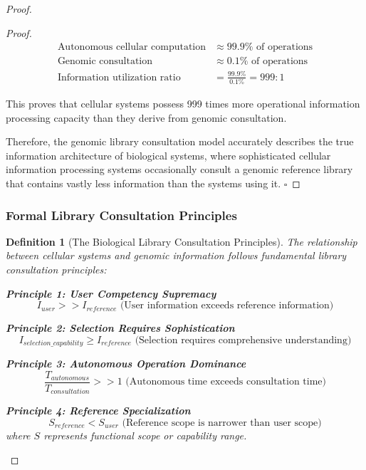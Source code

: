 \documentclass[12pt,a4paper]{article}
\newtheorem{definition}[theorem]{Definition}
\begin{document}
\begin{proof}
\begin{proof}
\begin{align}
\text{Autonomous cellular computation} &\approx 99.9\% \text{ of operations} \\
\text{Genomic consultation} &\approx 0.1\% \text{ of operations} \\
\text{Information utilization ratio} &= \frac{99.9\%}{0.1\%} = 999:1
\end{align}

This proves that cellular systems possess 999 times more operational information processing capacity than they derive from genomic consultation.

Therefore, the genomic library consultation model accurately describes the true information architecture of biological systems, where sophisticated cellular information processing systems occasionally consult a genomic reference library that contains vastly less information than the systems using it. $\square$
\end{proof}

\subsubsection{Formal Library Consultation Principles}

\begin{definition}[The Biological Library Consultation Principles]
The relationship between cellular systems and genomic information follows fundamental library consultation principles:

\textbf{Principle 1: User Competency Supremacy}
\begin{equation}
I_{user} >> I_{reference} \text{ (User information exceeds reference information)}
\end{equation}

\textbf{Principle 2: Selection Requires Sophistication}
\begin{equation}
I_{selection\_capability} \geq I_{reference} \text{ (Selection requires comprehensive understanding)}
\end{equation}

\textbf{Principle 3: Autonomous Operation Dominance}
\begin{equation}
\frac{T_{autonomous}}{T_{consultation}} >> 1 \text{ (Autonomous time exceeds consultation time)}
\end{equation}

\textbf{Principle 4: Reference Specialization}
\begin{equation}
S_{reference} < S_{user} \text{ (Reference scope is narrower than user scope)}
\end{equation}
where $S$ represents functional scope or capability range.
\end{definition}


\end{proof}
\end{document}
